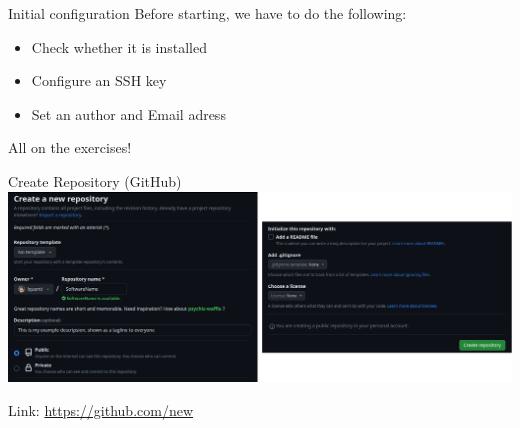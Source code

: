 \documentclass[compress,aspectratio=169]{beamer}
\begin{document}
  \begin{frame}{Initial configuration}
    Before starting, we have to do the following:
    \begin{itemize}
      \item Check whether it is installed
      \item Configure an SSH key
      \item Set an author and Email adress
    \end{itemize}
    \begin{center}
    \Large All on the exercises!
    \end{center}
  \end{frame}

  \begin{frame}{Create Repository (GitHub)}
    \includegraphics[width=\textwidth]{./assets/gh.png}
    \begin{center}
      Link: \href{https://github.com/new}{\url{https://github.com/new}}
    \end{center}
  \end{frame}
\end{document}
